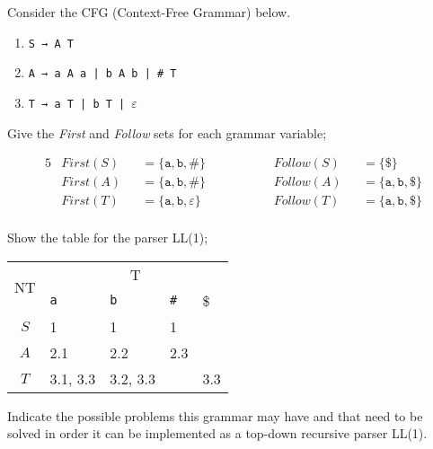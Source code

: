 \documentclass[docid=2017]{comp_test1}
\begin{document}
\setcounter{chapter}{2017}


Consider the CFG (Context-Free Grammar) below.

\begin{enumerate}
    \item \texttt{S → A T}
    \item \texttt{A → a A a | b A b | \# T}
    \item \texttt{T → a T | b T | $\varepsilon$}
\end{enumerate}

\question
Give the \textit{First} and \textit{Follow} sets for each grammar variable;

\ansseparator

\vspace{-2.0em}
\begin{alignat*}{5}
    & First (S) &&= \{ \texttt{a}, \texttt{b}, \texttt{\#} \} && ~~~~~~~~~~ && Follow(S) &&= \{ \$                         \} \\
    & First (A) &&= \{ \texttt{a}, \texttt{b}, \texttt{\#} \} && ~~~~~~~~~~ && Follow(A) &&= \{ \texttt{a}, \texttt{b}, \$ \} \\
    & First (T) &&= \{ \texttt{a}, \texttt{b}, \varepsilon \} && ~~~~~~~~~~ && Follow(T) &&= \{ \texttt{a}, \texttt{b}, \$ \} \\
\end{alignat*}
\vspace{-3.0em}

\question
Show the table for the parser LL(1);

\ansseparator

\begin{center}
    \small
    \begin{tabular}{@{} c | p{33mm} | p{33mm} | p{33mm} | p{33mm} @{}}
        \multirow{2}{*}{NT} & \multicolumn{4}{c}{T} \\ \cline{2-5}
        & \texttt{a} & \texttt{b} & \texttt{\#} & \$ \\ \hline
        $S$ & 1 & 1 & 1 &  \\ \hline
        $A$ & 2.1 & 2.2 & 2.3 &  \\ \hline
        $T$ & 3.1, 3.3 & 3.2, 3.3 &   & 3.3
    \end{tabular}
\end{center}

\question
Indicate the possible problems this grammar may have and that need to be solved in order it can be implemented as a top-down recursive parser LL(1).
\end{document}
